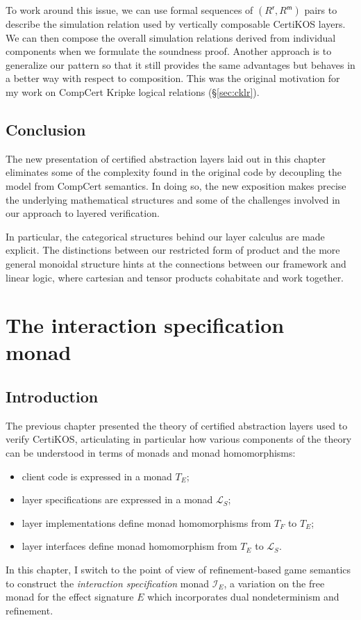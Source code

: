 \documentclass[11pt,oneside,draft]{book}
\theoremstyle{definition}
\newcommand{\kw}[1]{\ensuremath{ \mathsf{#1} }}
\begin{document}
To work around this issue,
we can use formal sequences of
$(R^\kw{r}, R^\kw{m})$ pairs to describe the
simulation relation used by vertically composable
CertiKOS layers.
We can then compose 
the overall simulation relations derived from
individual components
when we formulate the soundness proof.
Another approach is to generalize our pattern
so that it still provides the same advantages
but behaves in a better way
with respect to composition.
This was the original motivation
for my work on
CompCert Kripke logical relations
(\S\ref{sec:cklr}).



\section{Conclusion} %

The new presentation of certified abstraction layers
laid out in this chapter
eliminates some of the complexity found in the original code
by decoupling the model from CompCert semantics.
In doing so,
the new exposition makes precise the underlying mathematical structures
and some of the challenges involved in
our approach to layered verification.

In particular,
the categorical structures behind our layer calculus
are made explicit.
The distinctions between our restricted form of product
and the more general monoidal structure
hints at the connections between our framework
and linear logic,
where cartesian and tensor products cohabitate
and work together.




\chapter{The interaction specification monad} \label{sec:intspec} %

\section{Introduction} %

The previous chapter presented
the theory of certified abstraction layers
used to verify CertiKOS,
articulating in particular
how various components of the theory
can be understood
in terms of monads and monad homomorphisms:
\begin{itemize}
  \item client code is expressed in a monad $T_E$;
  \item layer specifications are expressed in a monad $\mathcal{L}_S$;
  \item layer implementations define monad homomorphisms from $T_F$ to $T_E$;
  \item layer interfaces define monad homomorphism from $T_E$ to $\mathcal{L}_S$.
\end{itemize}
In this chapter,
I switch to the point of view of refinement-based game semantics
to construct the \emph{interaction specification} monad $\mathcal{I}_E$,
a variation on the free monad for the effect signature $E$
which incorporates dual nondeterminism and refinement.
\end{document}
